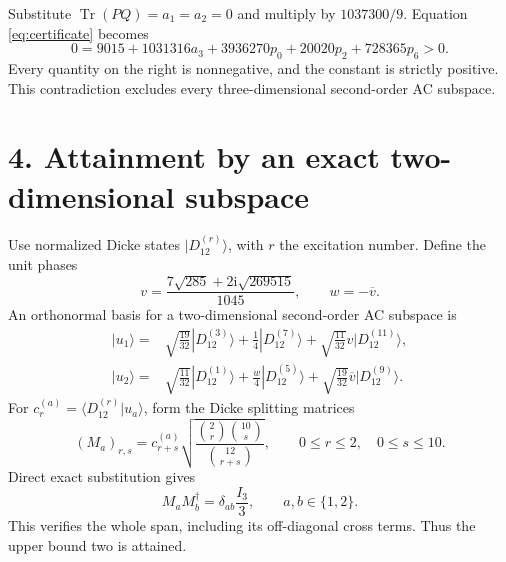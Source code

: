 \documentclass[11pt]{article}
\newcommand{\Tr}{\operatorname{Tr}}
\newcommand{\ii}{\mathrm{i}}
\begin{document}
Substitute $\Tr(PQ)=a_1=a_2=0$ and multiply by $1037300/9$. Equation \eqref{eq:certificate} becomes
\begin{equation}
 \boxed{\quad 0=9015+1031316a_3+3936270p_0+20020p_2+728365p_6>0.\quad}
 \label{eq:contradiction}
\end{equation}
Every quantity on the right is nonnegative, and the constant is strictly positive. This contradiction excludes every three-dimensional second-order AC subspace.

\section*{4. Attainment by an exact two-dimensional subspace}
Use normalized Dicke states $|D_{12}^{(r)}\rangle$, with $r$ the excitation number. Define the unit phases
\[
 v=\frac{7\sqrt{285}+2\ii\sqrt{269515}}{1045},\qquad
 w=-\overline v.
\]
An orthonormal basis for a two-dimensional second-order AC subspace is
\begin{align*}
 |u_1\rangle={}&\sqrt{\frac{19}{32}}|D_{12}^{(3)}\rangle
 +\frac14|D_{12}^{(7)}\rangle
 +\sqrt{\frac{11}{32}}v|D_{12}^{(11)}\rangle,\\
 |u_2\rangle={}&\sqrt{\frac{11}{32}}|D_{12}^{(1)}\rangle
 +\frac w4|D_{12}^{(5)}\rangle
 +\sqrt{\frac{19}{32}}\overline v|D_{12}^{(9)}\rangle.
\end{align*}
For $c_r^{(a)}=\langle D_{12}^{(r)}|u_a\rangle$, form the Dicke splitting matrices
\[
 (M_a)_{r,s}=c_{r+s}^{(a)}
 \sqrt{\frac{\binom2r\binom{10}s}{\binom{12}{r+s}}},
 \qquad 0\le r\le2,\quad0\le s\le10.
\]
Direct exact substitution gives
\[
 M_aM_b^\dagger=\delta_{ab}\frac{I_3}{3},\qquad a,b\in\{1,2\}.
\]
This verifies the whole span, including its off-diagonal cross terms. Thus the upper bound two is attained.
\end{document}
